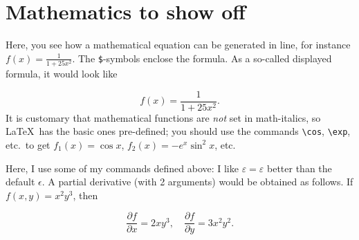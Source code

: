 \newcommand\premathpar{\vspace{-2\parskip}\par}
\chapter{Mathematics to show off}
\newcommand{\half}{\frac{1}{2}}
\newcommand{\eps}{\varepsilon}
\newcommand{\rh}{\rho}
\newcommand{\mtheta}{\vartheta}
\newcommand{\ph}{\varphi}
\newcommand{\der}[2]{\frac{\partial {#1}}{\partial {#2}}}

Here, you see how a mathematical equation can be generated in line, for
instance $f(x) = \frac{1}{1+25 x^2}$.
The \verb+$+-symbols enclose the formula.
As a so-called displayed formula, it would look like\premathpar
\begin{displaymath}
  f(x) = \frac{1}{1+25 x^2}.
\end{displaymath}
It is customary that mathematical functions are \emph{not} set in math-italics,
so \LaTeX\ has the basic ones pre-defined; you should use the commands
\verb+\cos+, \verb+\exp+, etc.\ to get $f_1(x) = \cos x$,
$f_2(x) = - e^x \sin^2 x$, etc.

Here, I use some of my commands defined above: I like $\eps = \varepsilon$
better than the default $\epsilon$. A partial derivative (with 2 arguments)
would be obtained as follows. If $f(x,y) = x^2 y^3$, then \premathpar
\begin{displaymath}
  \der{f}{x} = 2 x y^3, \quad \der{f}{y} = 3 x^2 y^2.
\end{displaymath}
